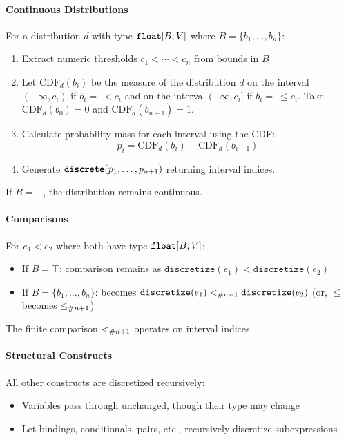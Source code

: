 \paragraph{Continuous Distributions} For a distribution $d$ with type $\textnormal{\ttfamily\bfseries float}[B; V]$ where $B = \{b_1, \ldots, b_n\}$:
\begin{enumerate}
    \item Extract numeric thresholds $c_1 < \cdots < c_n$ from bounds in $B$
    \item Let $\text{CDF}_d(b_i)$ be the measure of the distribution $d$ on the interval $(-\infty, c_i)$ if $b_i =\ <\!\!c_i$ and on the interval $(-\infty, c_i]$ if $b_i =\ \leq\!\!c_i$. Take $\text{CDF}_d(b_{0}) = 0$ and $\text{CDF}_d(b_{n+1}) = 1$.
    \item Calculate probability mass for each interval using the CDF:
    \[ p_i = \text{CDF}_d(b_i) - \text{CDF}_d(b_{i-1}) \]
    \item Generate $\textnormal{\ttfamily\bfseries discrete}(p_1, \ldots, p_{n+1})$ returning interval indices.
\end{enumerate}

If $B = \top$, the distribution remains continuous.

\paragraph{Comparisons} For $e_1 < e_2$ where both have type $\textnormal{\ttfamily\bfseries float}[B; V]$:
\begin{itemize}
    \item If $B = \top$: comparison remains as $\texttt{discretize}(e_1) < \texttt{discretize}(e_2)$
    \item If $B = \{b_1, \ldots, b_n\}$: becomes $\texttt{discretize}(e_1) <_{\#{n+1}} \texttt{discretize}(e_2)$ (or, $\leq$ becomes $\leq_{\#{n+1}}$)
\end{itemize}

The finite comparison $<_{\#{n+1}}$ operates on interval indices.

\paragraph{Structural Constructs} All other constructs are discretized recursively:
\begin{itemize}
    \item Variables pass through unchanged, though their type may change
    \item Let bindings, conditionals, pairs, etc., recursively discretize subexpressions
\end{itemize}

